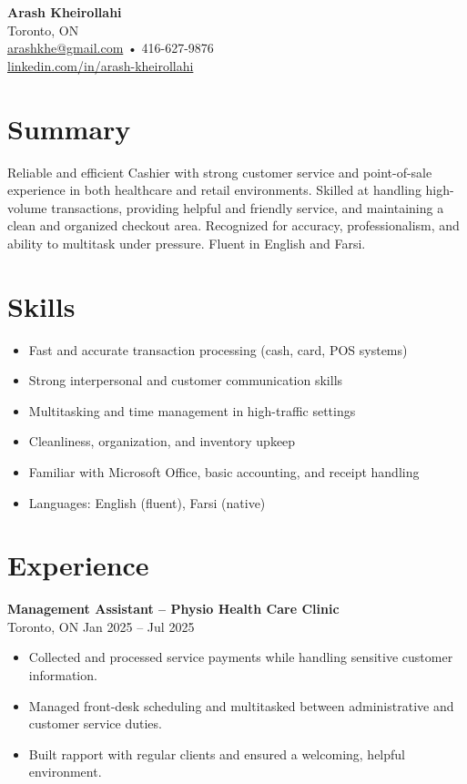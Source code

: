 \documentclass[letterpaper,11pt]{article}
\begin{document}

{\LARGE \textbf{Arash Kheirollahi}}\\[0.2em]
Toronto, ON \\
\href{mailto:arashkhe@gmail.com}{arashkhe@gmail.com} • 416-627-9876 \\
\href{https://linkedin.com/in/arash-kheirollahi}{linkedin.com/in/arash-kheirollahi} 

\vspace{0.8em}

\section*{Summary}
Reliable and efficient Cashier with strong customer service and point-of-sale experience in both healthcare and retail environments. Skilled at handling high-volume transactions, providing helpful and friendly service, and maintaining a clean and organized checkout area. Recognized for accuracy, professionalism, and ability to multitask under pressure. Fluent in English and Farsi.

\section*{Skills}
\begin{itemize}[leftmargin=*]
  \item Fast and accurate transaction processing (cash, card, POS systems)
  \item Strong interpersonal and customer communication skills
  \item Multitasking and time management in high-traffic settings
  \item Cleanliness, organization, and inventory upkeep
  \item Familiar with Microsoft Office, basic accounting, and receipt handling
  \item Languages: English (fluent), Farsi (native)
\end{itemize}

\section*{Experience}
\textbf{Management Assistant – Physio Health Care Clinic}\\
Toronto, ON \hfill Jan 2025 -- Jul 2025
\begin{itemize}[leftmargin=*]
  \item Collected and processed service payments while handling sensitive customer information.
  \item Managed front-desk scheduling and multitasked between administrative and customer service duties.
  \item Built rapport with regular clients and ensured a welcoming, helpful environment.
\end{itemize}
\end{document}
